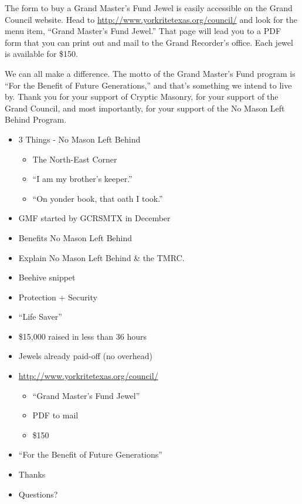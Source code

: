 \documentclass{article}
\begin{document}
\begin{multicols*}{2}
		The form to buy a Grand Master's Fund Jewel is easily accessible on the Grand Council website.  Head to \url{http://www.yorkritetexas.org/council/} and look for the menu item, ``Grand Master's Fund Jewel.'' That page will lead you to a PDF form that you can print out and mail to the Grand Recorder's office. Each jewel is available for \$150.
		
		We can all make a difference. The motto of the Grand Master's Fund program is ``For the Benefit of Future Generations,'' and that's something we intend to live by. Thank you for your support of Cryptic Masonry, for your support of the Grand Council, and most importantly, for your support of the No Mason Left Behind Program.
		
		\vspace*{\fill}
		\columnbreak
		\begin{itemize}
			\item 3 Things - No Mason Left Behind
				\begin{itemize}
					\item The North-East Corner
					\item ``I am my brother's keeper.''
					\item ``On yonder book, that oath I took.''
				\end{itemize}
			\item GMF started by GCRSMTX in December
			\item Benefits No Mason Left Behind
			\item Explain No Mason Left Behind \& the TMRC.
			\item Beehive snippet
			\item Protection + Security
			\item ``Life Saver''
			\item \$15,000 raised in less than 36 hours
			\item Jewels already paid-off (no overhead)
			\item \url{http://www.yorkritetexas.org/council/}
				\begin{itemize}
					\item ``Grand Master's Fund Jewel''
					\item PDF to mail
					\item \$150
				\end{itemize}	
			\item ``For the Benefit of Future Generations''
			\item Thanks
			\item Questions?
		\end{itemize}
		\vspace*{\fill}
	\end{multicols*}
\end{document}
